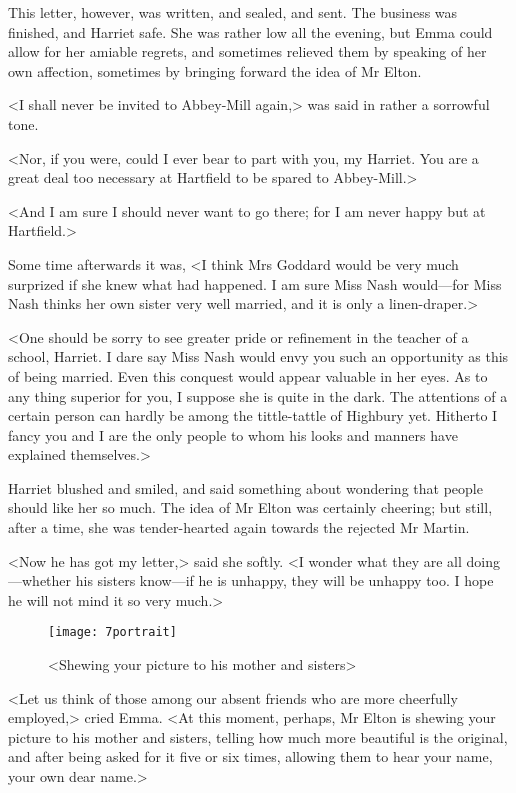 This letter, however, was written, and sealed, and sent. The business was finished, and Harriet safe. She was rather low all the evening, but Emma could allow for her amiable regrets, and sometimes relieved them by speaking of her own affection, sometimes by bringing forward the idea of Mr Elton.

<I shall never be invited to Abbey-Mill again,> was said in rather a sorrowful tone.

<Nor, if you were, could I ever bear to part with you, my Harriet. You are a great deal too necessary at Hartfield to be spared to Abbey-Mill.>

<And I am sure I should never want to go there; for I am never happy but at Hartfield.>

Some time afterwards it was, <I think Mrs Goddard would be very much surprized if she knew what had happened. I am sure Miss Nash would—for Miss Nash thinks her own sister very well married, and it is only a linen-draper.>

<One should be sorry to see greater pride or refinement in the teacher of a school, Harriet. I dare say Miss Nash would envy you such an opportunity as this of being married. Even this conquest would appear valuable in her eyes. As to any thing superior for you, I suppose she is quite in the dark. The attentions of a certain person can hardly be among the tittle-tattle of Highbury yet. Hitherto I fancy you and I are the only people to whom his looks and manners have explained themselves.>

Harriet blushed and smiled, and said something about wondering that people should like her so much. The idea of Mr Elton was certainly cheering; but still, after a time, she was tender-hearted again towards the rejected Mr Martin.

<Now he has got my letter,> said she softly. <I wonder what they are all doing—whether his sisters know—if he is unhappy, they will be unhappy too. I hope he will not mind it so very much.>

\begin{figure}[tbph]
\centering
\texttt{[image: 7portrait]}
\caption{<Shewing your picture to his mother and sisters>}
\end{figure}

<Let us think of those among our absent friends who are more cheerfully employed,> cried Emma. <At this moment, perhaps, Mr Elton is shewing your picture to his mother and sisters, telling how much more beautiful is the original, and after being asked for it five or six times, allowing them to hear your name, your own dear name.>

